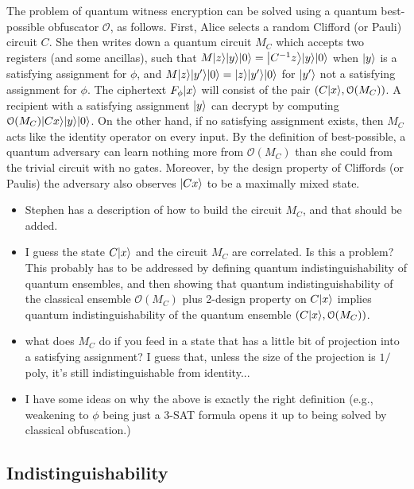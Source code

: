 \documentclass[11pt]{article}
\numberwithin{equation}{section}
\begin{document}
{The problem of quantum witness encryption can be solved using a quantum best-possible obfuscator $\mathcal O$, as follows. First, Alice selects a random Clifford (or Pauli) circuit $C$. She then writes down a quantum circuit $M_C$ which accepts two registers (and some ancillas), such that $M {\left\vert{z}\right\rangle} {\left\vert{y}\right\rangle} {\left\vert{0}\right\rangle} = {\left\vert{C^{-1}z}\right\rangle} {\left\vert{y}\right\rangle} {\left\vert{0}\right\rangle}$ when ${\left\vert{y}\right\rangle}$ is a satisfying assignment for $\phi$, and $M {\left\vert{z}\right\rangle} {\left\vert{y'}\right\rangle} {\left\vert{0}\right\rangle} = {\left\vert{z}\right\rangle} {\left\vert{y'}\right\rangle} {\left\vert{0}\right\rangle}$ for ${\left\vert{y'}\right\rangle}$ not a satisfying assignment for $\phi$. The ciphertext $F_\phi {\left\vert{x}\right\rangle}$ will consist of the pair $(C {\left\vert{x}\right\rangle}, \mathcal O(M_C))$. A recipient with a satisfying assignment ${\left\vert{y}\right\rangle}$ can decrypt by computing $\mathcal O(M_C) {\left\vert{Cx}\right\rangle} {\left\vert{y}\right\rangle} {\left\vert{0}\right\rangle}$. On the other hand, if no satisfying assignment exists, then $M_C$ acts like the identity operator on every input. By the definition of best-possible, a quantum adversary can learn nothing more from $\mathcal O(M_C)$ than she could from the trivial circuit with no gates. Moreover, by the design property of Cliffords (or Paulis) the adversary also observes ${\left\vert{Cx}\right\rangle}$ to be a maximally mixed state.

\begin{itemize}
\item Stephen has a description of how to build the circuit $M_C$, and that should be added.
\item I guess the state $C {\left\vert{x}\right\rangle}$ and the circuit $M_C$ are correlated. Is this a problem? This probably has to be addressed by defining quantum indistinguishability of quantum ensembles, and then showing that quantum indistinguishability of the classical ensemble $\mathcal O(M_C)$ plus 2-design property on $C {\left\vert{x}\right\rangle}$ implies quantum indistinguishability of the quantum ensemble $(C {\left\vert{x}\right\rangle}, \mathcal O(M_C))$.
\item what does $M_C$ do if you feed in a state that has a little bit of projection into a satisfying assignment? I guess that, unless the size of the projection is $1/$poly, it's still indistinguishable from identity...
\item I have some ideas on why the above is exactly the right definition (e.g., weakening to $\phi$ being just a 3-SAT formula opens it up to being solved by classical obfuscation.) 
\end{itemize}

\subsection{Indistinguishability}

}
\end{document}
